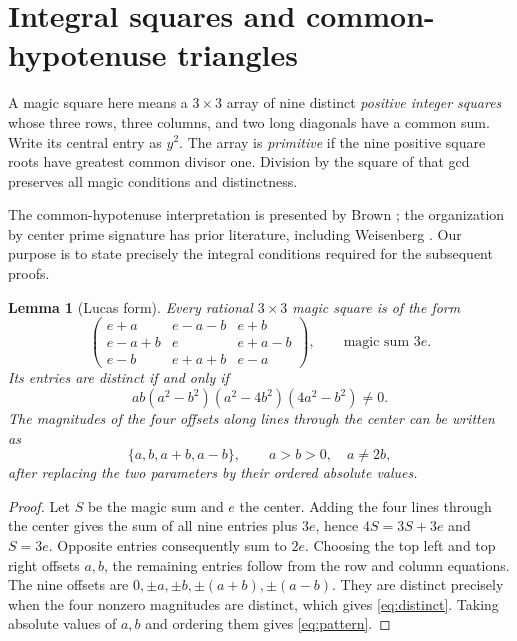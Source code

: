 \documentclass[11pt,letterpaper]{article}
\newtheorem{lemma}[theorem]{Lemma}
\theoremstyle{definition}\newtheorem{definition}[theorem]{Definition}
\theoremstyle{remark}\newtheorem{remark}[theorem]{Remark}
\begin{document}
\section{Integral squares and common-hypotenuse triangles}\label{sec:dictionary}
A magic square here means a $3\times3$ array of nine distinct \emph{positive integer squares} whose three rows, three columns, and two long diagonals have a common sum. Write its central entry as $y^2$. The array is \emph{primitive} if the nine positive square roots have greatest common divisor one. Division by the square of that gcd preserves all magic conditions and distinctness.

The common-hypotenuse interpretation is presented by Brown \cite{Brown511}; the organization by center prime signature has prior literature, including Weisenberg \cite{Weisenberg}. Our purpose is to state precisely the integral conditions required for the subsequent proofs.

\begin{lemma}[Lucas form]\label{lem:lucas}
Every rational $3\times3$ magic square is of the form
\[
\begin{pmatrix}
e+a&e-a-b&e+b\\
e-a+b&e&e+a-b\\
e-b&e+a+b&e-a
\end{pmatrix},\qquad \text{magic sum }3e.
\]
Its entries are distinct if and only if
\begin{equation}\label{eq:distinct}
ab(a^2-b^2)(a^2-4b^2)(4a^2-b^2)\ne0.
\end{equation}
The magnitudes of the four offsets along lines through the center can be written as
\begin{equation}\label{eq:pattern}
\{a,b,a+b,a-b\},\qquad a>b>0,\quad a\ne2b,
\end{equation}
after replacing the two parameters by their ordered absolute values.
\end{lemma}
\begin{proof}
Let $S$ be the magic sum and $e$ the center. Adding the four lines through the center gives the sum of all nine entries plus $3e$, hence $4S=3S+3e$ and $S=3e$. Opposite entries consequently sum to $2e$. Choosing the top left and top right offsets $a,b$, the remaining entries follow from the row and column equations. The nine offsets are $0,\pm a,\pm b,\pm(a+b),\pm(a-b)$. They are distinct precisely when the four nonzero magnitudes are distinct, which gives \eqref{eq:distinct}. Taking absolute values of $a,b$ and ordering them gives \eqref{eq:pattern}.
\end{proof}
\end{document}
